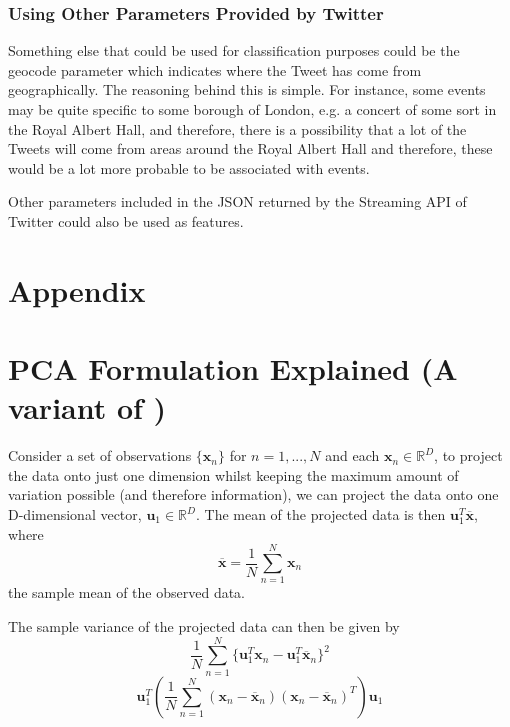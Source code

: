 \documentclass[11pt,a4paper]{article}
\begin{document}
\subsubsection{Using Other Parameters Provided by Twitter}
Something else that could be used for classification purposes could be the geocode parameter which indicates where the Tweet has come from geographically. The reasoning behind this is simple. For instance, some events may be quite specific to some borough of London, e.g. a concert of some sort in the Royal Albert Hall, and therefore, there is a possibility that a lot of the Tweets will come from areas around the Royal Albert Hall and therefore, these would be a lot more probable to be associated with events. 

Other parameters included in the JSON returned by the Streaming API of Twitter could also be used as features. 

\clearpage



\clearpage

\section{Appendix}\label{appendixa}

\appendix
{}

\section{PCA Formulation Explained (A variant of \cite{bishop})}

Consider a set of observations $\{\mathbf{x}_n\}$ for $n = 1, ..., N$ and each $\mathbf{x}_n \in \mathbb{R}^D$, to project the data onto just one dimension whilst keeping the maximum amount of variation possible (and therefore information), we can project the data onto one D-dimensional vector, $\mathbf{u}_1 \in \mathbb{R}^D$. The mean of the projected data is then $\mathbf{u}_1^T \mathbf{\overline{x}}$, where
\begin{equation*}
\mathbf{\overline{x}} = \frac{1}{N} \sum_{n = 1}^N \mathbf{x}_n 
\end{equation*} 
the sample mean of the observed data.

The sample variance of the projected data can then be given by
\begin{equation*}
\frac{1}{N} \sum_{n = 1}^N \{\mathbf{u}_1^T\mathbf{x}_n -  \mathbf{u}_1^T\mathbf{\overline{x}}_n\}^2
\end{equation*} 
\begin{equation*}
\mathbf{u}_1^T \left( \frac{1}{N} \sum_{n = 1}^N \left(\mathbf{x}_n - \mathbf{\overline{x}}_n\right)\left(\mathbf{x}_n - \mathbf{\overline{x}}_n\right)^T \right) \mathbf{u}_1
\end{equation*} 
\end{document}
